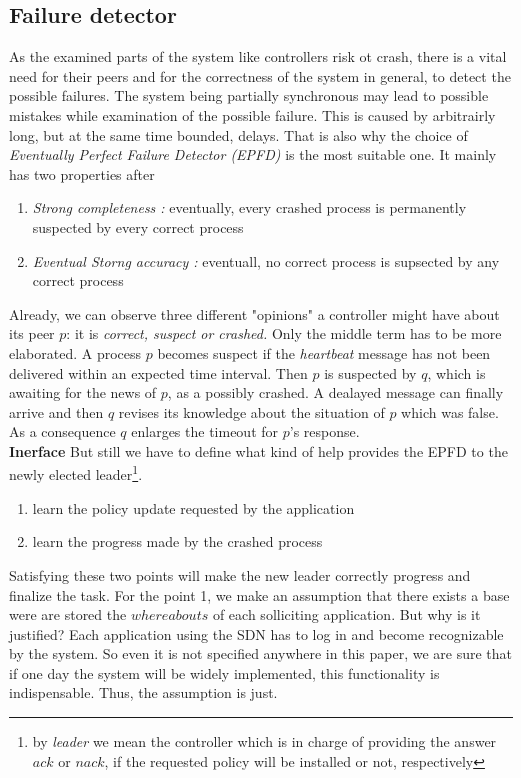 \documentclass{article}
\begin{document}
\subsection{Failure detector}
As the examined parts of the system like controllers risk ot crash, there is a vital need for their peers and for the correctness of the system in general, to detect the possible failures. The system being partially synchronous may lead to possible mistakes while examination of the possible failure. This is caused by arbitrairly long, but at the same time bounded, delays.
That is also why the choice of \emph{Eventually Perfect Failure Detector (EPFD)} is the most suitable one. It mainly has two properties after \cite{Guerraoui:2010:IRD:1951643}
\begin{enumerate}
\item \emph{Strong completeness :} eventually, every crashed process is permanently suspected by every correct process
\item  \emph{Eventual Storng accuracy :} eventuall, no correct process is supsected by any correct process
\end{enumerate}
Already, we can observe three different "opinions" a controller might have about its peer $p$: it is \emph{correct, suspect or crashed.} Only the middle term has to be more elaborated. A process $p$ becomes suspect if the \emph{heartbeat} message has not been delivered within an expected time interval. Then $p$ is suspected by $q$, which is awaiting for the news of $p$, as a possibly crashed. A dealayed message can finally arrive and then $q$ revises its knowledge about the situation of $p$ which was false. As a consequence $q$ enlarges the timeout for $p$'s response.\\
\textbf{Inerface} But still we have to define what kind of help provides the EPFD to the newly elected leader\footnote{by \emph{leader} we mean the controller which is in charge of providing the answer $ack$ or $nack$, if the requested policy will be installed or not, respectively}.
\begin{enumerate}
\item learn the policy update requested by the application
\item learn the progress made by the crashed process 
\end{enumerate}
Satisfying these two points will make the new leader correctly progress and finalize the task.
For the point 1, we make an assumption that there exists a base were are stored the $whereabouts$ of each solliciting application. But why is it justified? Each application using the SDN has to log in and become recognizable by the system. So even it is not specified anywhere in this paper, we are sure that if one day the system will be widely implemented, this functionality is indispensable. Thus, the assumption is just.\\
\end{document}
